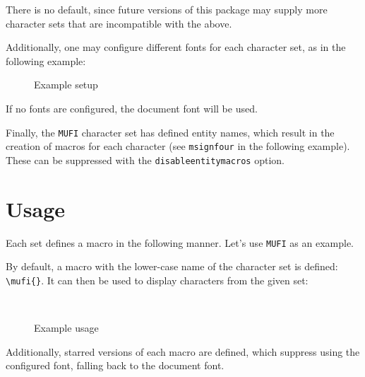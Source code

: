 \documentclass{article}
\begin{document}
There is no default, since future versions of this package may supply more character sets that are incompatible with the above.

\clearpage
Additionally, one may configure different fonts for each character set, as in the following example:

\begin{figure}[H]
\centering
\begin{verbatimtab}
\usepackage[
	MUFI,
	TITUS,
	fonts={
		MUFI=\mufifont,
		TITUS=\titusfont,
	},
]{unicode-alphabets}
\end{verbatimtab}
\caption{Example setup}
\end{figure}

If no fonts are configured, the document font will be used.

Finally, the \verb|MUFI| character set has defined entity names, which result in the creation of macros for each character (see \verb|msignfour| in the following example). These can be suppressed with the \verb|disableentitymacros| option.

\section{Usage}

Each set defines a macro in the following manner. Let's use \verb|MUFI| as an example.

By default, a macro with the lower-case name of the character set is defined: \verb|\mufi{}|. It can then be used to display characters from the given set:

\begin{figure}[H]
\centering
\begin{LTXexample}[varwidth=true]
\\
\msignflour{}
\end{LTXexample}
\caption{Example usage}
\end{figure}

Additionally, starred versions of each macro are defined, which suppress using the configured font, falling back to the document font.

\printbibliography
\end{document}
